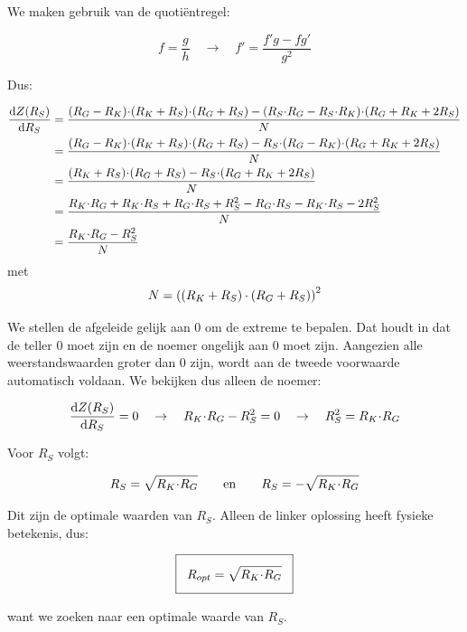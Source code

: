 \documentclass[12pt,a4paper,final,twoside,fleqn]{article}
\newcommand{\ropt}{R_{opt}}
\let\oldcdot\cdot
\renewcommand{\cdot}{\kern-.10em\oldcdot\kern-.10em}
\newcommand{\cdotw}{\kern.08em\oldcdot\kern.08em}
\begin{document}
We maken gebruik van de quoti\"entregel:

\begin{equation}
f = \dfrac{g}{h} \quad \rightarrow \quad f' = \dfrac{f'g-fg'}{g^2}
\end{equation}

Dus:

\begin{equation}
\begin{split}
\dfrac{\text{d} Z(R_S)}{\text{d} R_S} &= 
\dfrac{(R_G-R_K)\cdot(R_K+R_S)\cdot(R_G+R_S) - (R_S\cdot R_G - R_S\cdot R_K)\cdot(R_G+R_K+2R_S)}{N} \\
&= \dfrac{(R_G-R_K)\cdot(R_K+R_S)\cdot(R_G+R_S) - R_S\cdot(R_G - R_K)\cdot(R_G+R_K+2R_S)}{N} \\
&= \dfrac{(R_K+R_S)\cdot(R_G+R_S) - R_S\cdot(R_G+R_K+2R_S)}{N} \\
&= \dfrac{R_K\cdot R_G + R_K\cdot R_S + R_G\cdot R_S + R_S^2 - R_G\cdot R_S - R_K\cdot R_S -2R_S^2}{N} \\
&= \dfrac{R_K\cdot R_G - R_S^2}{N}
\end{split}
\end{equation}
met
\begin{equation}
N = \left((R_K+R_S)\cdotw(R_G+R_S)\right)^2
\end{equation}

We stellen de afgeleide gelijk aan 0 om de extreme te bepalen. Dat houdt in dat
de teller 0 moet zijn en de noemer ongelijk aan 0 moet zijn. Aangezien alle
weerstandswaarden groter dan 0 zijn, wordt aan de tweede voorwaarde automatisch
voldaan. We bekijken dus alleen de noemer:

\begin{equation}
\dfrac{\text{d} Z(R_S)}{\text{d} R_S} = 0 \quad\rightarrow\quad  R_K\cdot R_G - R_S^2 = 0
\quad\rightarrow\quad R_S^2 = R_K\cdot R_G
\end{equation}

Voor $R_S$ volgt:

\begin{equation}
R_S = \sqrt{R_K\cdot R_G} \qquad\text{en}\qquad R_S = -\sqrt{R_K\cdot R_G}
\end{equation}

Dit zijn de optimale waarden van $R_S$. Alleen de linker oplossing heeft fysieke
betekenis, dus:

\begin{equation}
\setlength\fboxsep{2ex}
\boxed{\ropt = \sqrt{R_K\cdot R_G}}
\end{equation}

want we zoeken naar een optimale waarde van $R_S$.

\newpage
{}
\printbibliography{}
\end{document}

